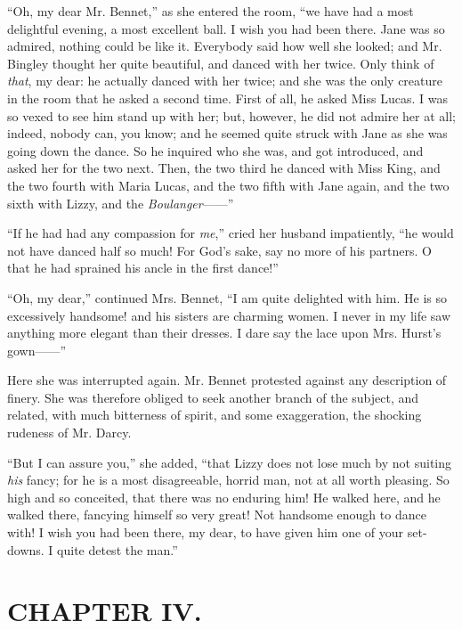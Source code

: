``Oh, my dear Mr. Bennet,'' as she entered the room, ``we have had a most delightful evening, a most excellent ball. I wish you had been there. Jane was so admired, nothing could be like it. Everybody said how well she looked; and Mr. Bingley thought her quite beautiful, and danced with her twice. Only think of \textit{that}, my dear: he actually danced with her twice; and she was the only creature in the room that he asked a second time. First of all, he asked Miss Lucas. I was so vexed to see him stand up with her; but, however, he did not admire her at all; indeed, nobody can, you know; and he seemed quite struck with Jane as she was going down the dance. So he inquired who she was, and got introduced, and asked her for the two next. Then, the two third he danced with Miss King, and the two fourth with Maria Lucas, and the two fifth with Jane again, and the two sixth with Lizzy, and the \textit{Boulanger}------''

``If he had had any compassion for \textit{me},'' cried her husband impatiently, ``he would not have danced half so much! For God's sake, say no more of his partners. O that he had sprained his ancle in the first dance!''

``Oh, my dear,'' continued Mrs. Bennet, ``I am quite delighted with him. He is so excessively handsome! and his sisters are charming women. I never in my life saw anything more elegant than their dresses. I dare say the lace upon Mrs. Hurst's gown------''

Here she was interrupted again. Mr. Bennet protested against any description of finery. She was therefore obliged to seek another branch of the subject, and related, with much bitterness of spirit, and some exaggeration, the shocking rudeness of Mr. Darcy.

``But I can assure you,'' she added, ``that Lizzy does not lose much by not suiting \textit{his} fancy; for he is a most disagreeable, horrid man, not at all worth pleasing. So high and so conceited, that there was no enduring him! He walked here, and he walked there, fancying himself so very great! Not handsome enough to dance with! I wish you had been there, my dear, to have given him one of your set-downs. I quite detest the man.''


\chapter{CHAPTER IV.}

